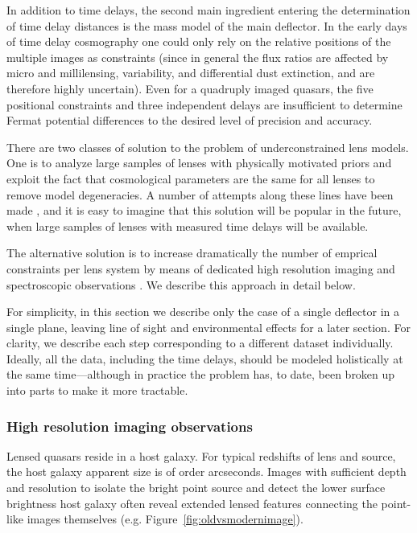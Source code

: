 In addition to time delays, the second main ingredient entering the
determination of time delay distances is the mass model of the main
deflector. In the early days of time delay cosmography one could only
rely on the relative positions of the multiple images as constraints
(since in general the flux ratios are affected by micro and
millilensing, variability, and differential dust extinction, and are
therefore highly uncertain). Even for a quadruply imaged quasars, the
five positional constraints and three independent delays are
insufficient to determine Fermat potential differences to the desired
level of precision and accuracy.

There are two classes of solution to the problem of underconstrained
lens models. One is to analyze large samples of lenses with physically
motivated priors and exploit the fact that cosmological parameters are
the same for all lenses to remove model degeneracies. A number of
attempts along these lines have been made \citep{Ogu07b,RK++2015}, and
it is easy to imagine that this solution will be popular in the
future, when large samples of lenses with measured time delays will be
available.

The alternative solution is to increase dramatically the number of
emprical constraints per lens system by means of dedicated high
resolution imaging and spectroscopic observations
\citep{Suy++10,Suy++13,Suy++14}. We describe this approach in detail
below.

For simplicity, in this section we describe only the case of a single
deflector in a single plane, leaving line of sight and environmental
effects for a later section. For clarity, we describe each step
corresponding to a different dataset individually. Ideally, all the
data, including the time delays, should be modeled holistically at the
same time---although in practice the problem has, to date, been broken up
into parts to make it more tractable.


\subsubsection{High resolution imaging observations}

Lensed quasars reside in a host galaxy. For typical redshifts of lens
and source, the host galaxy apparent size is of order
arcseconds. Images with sufficient depth and resolution to isolate the
bright point source and detect the lower surface brightness host
galaxy often reveal extended lensed features connecting the
point-like images themselves (e.g. Figure~\ref{fig:oldvsmodernimage}).

